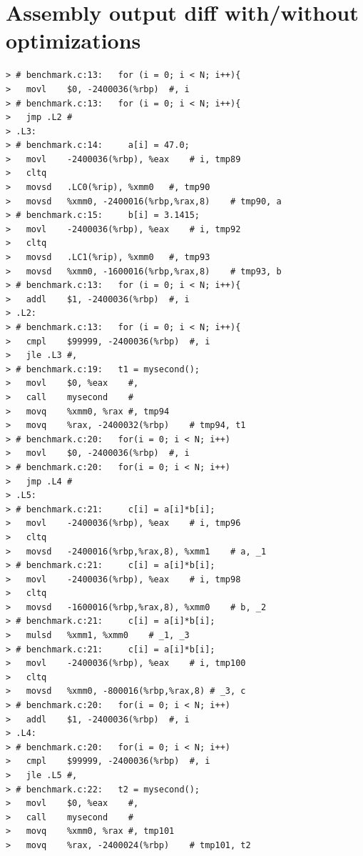 \documentclass[a4paper, 11pt]{article}
\begin{document}
\appendix
\section{Assembly output diff with/without optimizations}
\begin{lstlisting}[caption={Excerpt from the diff of the assembly generated for \texttt{benchmark.c} with optimization level -02 and with no optimization. Showing
lines which don't appear in the optimized version.},
label={listing:benchmark-asm-diff}]
> # benchmark.c:13:   for (i = 0; i < N; i++){
> 	movl	$0, -2400036(%rbp)	#, i
> # benchmark.c:13:   for (i = 0; i < N; i++){
> 	jmp	.L2	#
> .L3:
> # benchmark.c:14:     a[i] = 47.0;
> 	movl	-2400036(%rbp), %eax	# i, tmp89
> 	cltq
> 	movsd	.LC0(%rip), %xmm0	#, tmp90
> 	movsd	%xmm0, -2400016(%rbp,%rax,8)	# tmp90, a
> # benchmark.c:15:     b[i] = 3.1415;
> 	movl	-2400036(%rbp), %eax	# i, tmp92
> 	cltq
> 	movsd	.LC1(%rip), %xmm0	#, tmp93
> 	movsd	%xmm0, -1600016(%rbp,%rax,8)	# tmp93, b
> # benchmark.c:13:   for (i = 0; i < N; i++){
> 	addl	$1, -2400036(%rbp)	#, i
> .L2:
> # benchmark.c:13:   for (i = 0; i < N; i++){
> 	cmpl	$99999, -2400036(%rbp)	#, i
> 	jle	.L3	#,
> # benchmark.c:19:   t1 = mysecond();
> 	movl	$0, %eax	#,
> 	call	mysecond	#
> 	movq	%xmm0, %rax	#, tmp94
> 	movq	%rax, -2400032(%rbp)	# tmp94, t1
> # benchmark.c:20:   for(i = 0; i < N; i++)
> 	movl	$0, -2400036(%rbp)	#, i
> # benchmark.c:20:   for(i = 0; i < N; i++)
> 	jmp	.L4	#
> .L5:
> # benchmark.c:21:     c[i] = a[i]*b[i];
> 	movl	-2400036(%rbp), %eax	# i, tmp96
> 	cltq
> 	movsd	-2400016(%rbp,%rax,8), %xmm1	# a, _1
> # benchmark.c:21:     c[i] = a[i]*b[i];
> 	movl	-2400036(%rbp), %eax	# i, tmp98
> 	cltq
> 	movsd	-1600016(%rbp,%rax,8), %xmm0	# b, _2
> # benchmark.c:21:     c[i] = a[i]*b[i];
> 	mulsd	%xmm1, %xmm0	# _1, _3
> # benchmark.c:21:     c[i] = a[i]*b[i];
> 	movl	-2400036(%rbp), %eax	# i, tmp100
> 	cltq
> 	movsd	%xmm0, -800016(%rbp,%rax,8)	# _3, c
> # benchmark.c:20:   for(i = 0; i < N; i++)
> 	addl	$1, -2400036(%rbp)	#, i
> .L4:
> # benchmark.c:20:   for(i = 0; i < N; i++)
> 	cmpl	$99999, -2400036(%rbp)	#, i
> 	jle	.L5	#,
> # benchmark.c:22:   t2 = mysecond();
> 	movl	$0, %eax	#,
> 	call	mysecond	#
> 	movq	%xmm0, %rax	#, tmp101
> 	movq	%rax, -2400024(%rbp)	# tmp101, t2

\end{lstlisting}
\end{document}

